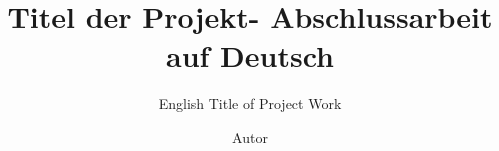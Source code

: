 \documentclass[envcountsame,envcountchap,deutsch]{i-studis}
\begin{document}
\title{Titel der Projekt- Abschlussarbeit auf Deutsch}
\subtitle{English Title of Project Work}
\author{Autor}                  %
\address{Ort, den}              %

\begingroup
  \renewcommand{\thepage}{Titel}
  \mytitlepage
  \newpage
\endgroup
\frontmatter 

\tableofcontents %
\mainmatter                     %







\backmatter                     %


\printindex %
\begin{appendix}
\end{appendix}
\end{document}
